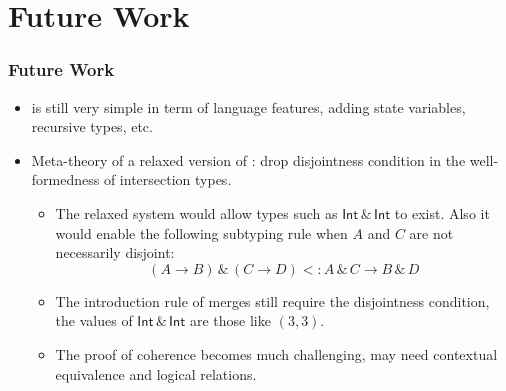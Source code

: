 \documentclass{beamer}
\begin{document}
\section{Future Work}

\begin{frame}
  \frametitle{Future Work}
  \begin{itemize}
  \item \name is still very simple in term of language features, adding state
    variables, recursive types, etc.
  \item Meta-theory of a relaxed version of \bname: drop disjointness condition in the
    well-formedness of intersection types.
    \begin{itemize}
    \item The relaxed system would allow types such as $\mathsf{Int} \,\&\, \mathsf{Int}$ to exist. Also it would enable the following subtyping rule
      when $A$ and $C$ are not necessarily disjoint:
      \[
        (A \rightarrow B) \,\&\, (C \rightarrow D) <: A \,\&\, C \rightarrow B \,\&\, D
      \]
    \item The introduction rule of merges still require the disjointness
      condition, the values of $\mathsf{Int} \,\&\, \mathsf{Int}$ are those like
      $(3,3)$.
    \item The proof of coherence becomes much challenging, may need contextual
      equivalence and logical relations.
    \end{itemize}



  \end{itemize}
\end{frame}
\end{document}
